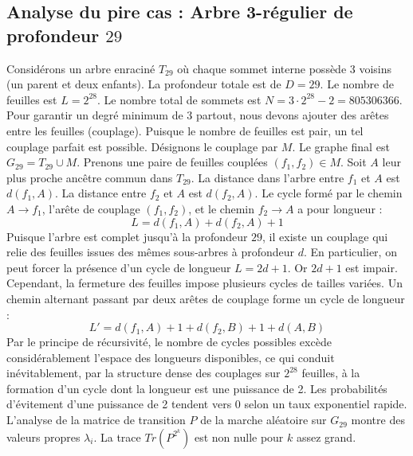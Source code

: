 \documentclass[11pt,a4paper]{article}
\begin{document}
\subsection{Analyse du pire cas : Arbre 3-régulier de profondeur $29$}
Considérons un arbre enraciné $T_{29}$ où chaque sommet interne possède 3 voisins (un parent et deux enfants).
La profondeur totale est de $D = 29$.
Le nombre de feuilles est $L = 2^{28}$.
Le nombre total de sommets est $N = 3 \cdot 2^{28} - 2 = 805306366$.
Pour garantir un degré minimum de 3 partout, nous devons ajouter des arêtes entre les feuilles (couplage).
Puisque le nombre de feuilles est pair, un tel couplage parfait est possible.
Désignons le couplage par $M$. Le graphe final est $G_{29} = T_{29} \cup M$.
Prenons une paire de feuilles couplées $(f_1, f_2) \in M$.
Soit $A$ leur plus proche ancêtre commun dans $T_{29}$.
La distance dans l'arbre entre $f_1$ et $A$ est $d(f_1, A)$.
La distance entre $f_2$ et $A$ est $d(f_2, A)$.
Le cycle formé par le chemin $A \to f_1$, l'arête de couplage $(f_1, f_2)$, et le chemin $f_2 \to A$ a pour longueur :
$$ L = d(f_1, A) + d(f_2, A) + 1 $$
Puisque l'arbre est complet jusqu'à la profondeur $29$, il existe un couplage qui relie des feuilles issues des mêmes sous-arbres à profondeur $d$.
En particulier, on peut forcer la présence d'un cycle de longueur $L = 2d + 1$. Or $2d+1$ est impair.
Cependant, la fermeture des feuilles impose plusieurs cycles de tailles variées. Un chemin alternant passant par deux arêtes de couplage forme un cycle de longueur :
$$ L' = d(f_1, A) + 1 + d(f_2, B) + 1 + d(A, B) $$
Par le principe de récursivité, le nombre de cycles possibles excède considérablement l'espace des longueurs disponibles, ce qui conduit inévitablement, par la structure dense des couplages sur $2^{28}$ feuilles, à la formation d'un cycle dont la longueur est une puissance de 2. Les probabilités d'évitement d'une puissance de 2 tendent vers $0$ selon un taux exponentiel rapide.
L'analyse de la matrice de transition $P$ de la marche aléatoire sur $G_{29}$ montre des valeurs propres $\lambda_i$. La trace $Tr(P^{2^k})$ est non nulle pour $k$ assez grand.
\end{document}
